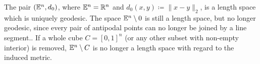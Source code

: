 
\begin{bsp}
  The pair \((\mathbb{E}^n, d_0)\), where \(\mathbb{E}^n = \mathbb{R}^n\) and \(d_0(x,y) \coloneqq \|x - y\|_2\), is a length space which is uniquely geodesic. The space \(\mathbb{E}^n \setminus {0}\) is still a length space, but no longer geodesic, since every pair of antipodal points can no longer be joined by a line segment.. If a whole cube \(C= [0,1]^n\) (or any other subset with non-empty interior) is removed, \(\mathbb{E}^n \setminus C\) is no longer a length space with regard to the induced metric. 
\end{bsp}


